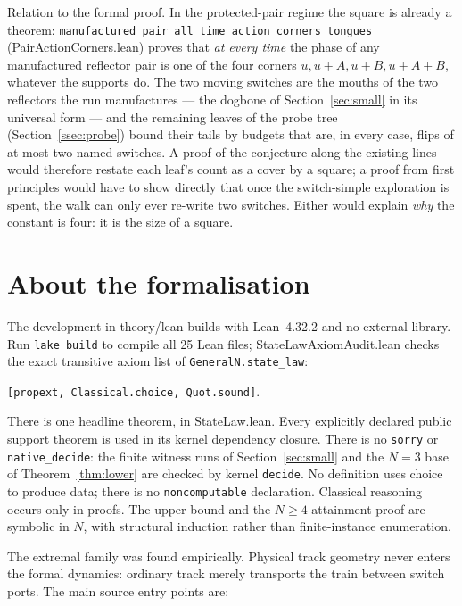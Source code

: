 \documentclass[11pt]{article}
\theoremstyle{definition}
\newcommand{\lean}[1]{\texttt{#1}}
\newcommand{\file}[1]{\textsf{#1}}
\begin{document}
Relation to the formal proof.  In the protected-pair regime the square is
already a theorem: \lean{manufactured\_pair\_all\_time\_action\_corners\_tongues}
(\file{PairActionCorners.lean}) proves that \emph{at every time} the
phase of any manufactured reflector pair is one of the four corners
$u, u{+}A, u{+}B, u{+}A{+}B$, whatever the supports do.  The two moving
switches are the mouths of the two reflectors the run manufactures ---
the dogbone of Section~\ref{sec:small} in its universal form --- and the
remaining leaves of the probe tree (Section~\ref{ssec:probe}) bound their
tails by budgets that are, in every case, flips of at most two named
switches.  A proof of the conjecture along the existing lines would
therefore restate each leaf's count as a cover by a square; a proof from
first principles would have to show directly that once the switch-simple
exploration is spent, the walk can only ever re-write two switches.
Either would explain \emph{why} the constant is four: it is the size of a
square.

\clearpage
\section{About the formalisation}\label{sec:formal}

The development in \file{theory/lean} builds with Lean~4.32.2 and no
external library. Run \texttt{lake build} to compile all 25 Lean files;
\file{StateLawAxiomAudit.lean} checks the exact transitive axiom list of
\lean{GeneralN.state\_law}:
\begin{center}
  \lean{[propext, Classical.choice, Quot.sound]}.
\end{center}

There is one headline theorem, in \file{StateLaw.lean}. Every explicitly
declared public support theorem is used in its kernel dependency closure.
There is no \lean{sorry} or \lean{native\_decide}: the finite witness runs
of Section~\ref{sec:small} and the $N=3$ base of
Theorem~\ref{thm:lower} are checked by kernel \lean{decide}.
No definition uses choice to produce data; there is no
\lean{noncomputable} declaration. Classical reasoning occurs only in proofs.
The upper bound and the $N\ge4$ attainment proof are symbolic in $N$,
with structural induction rather than finite-instance enumeration.

The extremal family was found empirically. Physical track geometry never
enters the formal dynamics: ordinary track merely transports the train
between switch ports. The main source entry points are:
\end{document}
